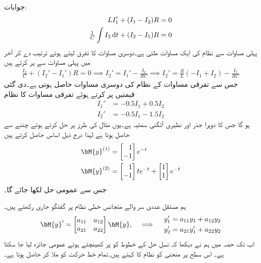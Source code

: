 جوابات:
\begin{align*}
LI_1'+(I_1-I_2)R&=0\\
\tfrac{1}{C}\int I_2 \dif t+(I_2-I_1)R&=0
\end{align*}
پہلی مساوات سے نظام کی ایک مساوات  ملتی ہے۔دوسری مساوات کا تفرق لیتے ہوئے ترتیب دے کر آخر میں پہلی مساوات سے  پر کرتے ہیں
\begin{align*}
\frac{I_2}{C}+(I_2'-I_1')R=0 \implies I_2'=I_1'-\frac{I_2}{RC} \implies  I_2'=\frac{R}{L}(-I_1+I_2)-\frac{I_2}{RC}
\end{align*}
جس سے تفرقی مساوات کے نظام کی دوسری مساوات  حاصل ہوتی ہے۔دی گئی قیمتیں پر کرتے ہوئے تفرقی مساوات کا نظام 
\begin{align*}
I_1'&=-0.5I_1+0.5I_2\\
I_2'&=-0.5I_1-1.5I_2
\end{align*}
ہو گا جس کا دوہرا جذر  اور نظیری آئگنی سمتیہ  ہے۔یوں مثال  کی طرز پر  حل کرتے ہوئے  چننے سے  حاصل ہوتا ہے لہٰذا درج ذیل اساس حاصل کرتے ہیں
\begin{align*}
\bM{y}^{(1)}&=\begin{bmatrix*}[r] 1\\ -1 \end{bmatrix*} e^{-t}\\
\bM{y}^{(2)}&=\begin{bmatrix*}[r] 1\\ -1 \end{bmatrix*} te^{-t}+\begin{bmatrix} 1\\1 \end{bmatrix}e^{-t}
\end{align*}
جس سے  عمومی حل  لکھا جائے گا۔

ہم مستقل عددی سر والے متجانس خطی نظام  پر گفتگو جاری رکھتے ہیں۔
\begin{gather}\label{مساوات_نظام_جانچ_نقطہ_فاصل_الف}
\begin{aligned}
\bM{y}'=\begin{bmatrix} a_{11} & a_{12} \\ a_{21} & a_{22} \end{bmatrix} \bM{y}
\end{aligned}, \quad \implies \quad 
\begin{aligned}
y_1'&=a_{11}y_1+a_{12}y_2\\
y_2'&=a_{21}y_1'+a_{22}y_2
\end{aligned}
\end{gather}
اب تک  حصہ  میں ہم نے دیکھا کہ نسل حل  کے خطوط کو   پر کھینچتے ہوئے عمومی جائزہ لیا جا سکتا ہے۔ اس سطح پر منحنی کو نظام  کا  کہتے ہیں۔تمام خط حرکت کو ملا کر  حاصل ہوتا ہے۔

